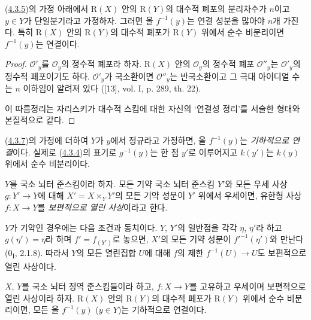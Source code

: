 \begin{corollary}[4.3.7]
\label{III.4.3.7-fr}
(\hyperref[III.4.3.5-fr]{4.3.5})의 가정 아래에서
$\mathrm R(X)$ 안의 $\mathrm R(Y)$의 대수적 폐포의 분리차수가
$n$이고 $y\in Y$가 단일분기라고 가정하자. 그러면 올 $f^{-1}(y)$는
연결 성분을 많아야 $n$개 가진다. 특히 $\mathrm R(X)$ 안의
$\mathrm R(Y)$의 대수적 폐포가 $\mathrm R(Y)$ 위에서 순수 비분리이면
$f^{-1}(y)$는 연결이다.
\end{corollary}

\begin{proof}
$\mathcal O'_y$를 $\mathcal O_y$의 정수적 폐포라 하자.
$\mathrm R(X)$ 안의 $\mathcal O_y$의 정수적 폐포
$\mathcal O''_y$는 $\mathcal O'_y$의 정수적 폐포이기도 하다.
$\mathcal O'_y$가 국소환이면 $\mathcal O''_y$는 반국소환이고 그 극대
아이디얼 수는 $n$ 이하임이 알려져 있다
([13], vol. I, p. 289, th. 22).

이 따름정리는 자리스키가 대수적 스킴에 대한 자신의
‘연결성 정리’를 서술한 형태와 본질적으로 같다.
\end{proof}

\begin{remark}[4.3.8]
\label{III.4.3.8-fr}
(\hyperref[III.4.3.7-fr]{4.3.7})의 가정에 더하여 $Y$가 $y$에서
정규라고 가정하면, 올 $f^{-1}(y)$는 \emph{기하적으로 연결}이다.
실제로 (\hyperref[III.4.3.4-fr]{4.3.4})의 표기로 $g^{-1}(y)$는 한
점 $y'$로 이루어지고 $k(y')$는 $k(y)$ 위에서 순수 비분리이다.
\end{remark}

\begin{definition}[4.3.9]
\label{III.4.3.9-fr}
$Y$를 국소 뇌터 준스킴이라 하자. 모든 기약 국소 뇌터 준스킴
$Y'$와 모든 우세 사상 $g:Y'\to Y$에 대해
$X'=X\times_YY'$의 모든 기약 성분이 $Y'$ 위에서 우세이면, 유한형
사상 $f:X\to Y$를 \emph{보편적으로 열린 사상}이라고 한다.
\end{definition}

$Y$가 기약인 경우에는 다음 조건과 동치이다. $Y$, $Y'$의 일반점을
각각 $\eta$, $\eta'$라 하고 $g(\eta')=\eta$라 하며
$f'=f_{(Y')}$로 놓으면, $X'$의 모든 기약 성분이
$f'^{-1}(\eta')$와 만난다 (0\textsubscript{I}, 2.1.8). 따라서
$Y$의 모든 열린집합 $U$에 대해 $f$의 제한
$f^{-1}(U)\to U$도 보편적으로 열린 사상이다.

\begin{corollary}[4.3.10]
\label{III.4.3.10-fr}
$X$, $Y$를 국소 뇌터 정역 준스킴들이라 하고, $f:X\to Y$를 고유하고
우세이며 보편적으로 열린 사상이라 하자. $\mathrm R(X)$ 안의
$\mathrm R(Y)$의 대수적 폐포가 $\mathrm R(Y)$ 위에서 순수
비분리이면, 모든 올 $f^{-1}(y)$ ($y\in Y$)는 기하적으로 연결이다.
\end{corollary}

